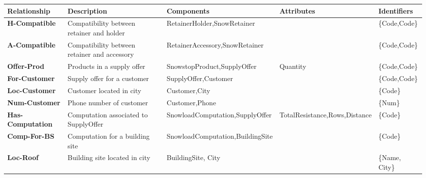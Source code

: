 \documentclass{article}[h]
\begin{document}
\begin{table}[H]
  \def\arraystretch{1.25}%
  \centering
  \begin{tabular}{ | m{3cm} | m{2.5cm}| m{3.5cm} | m{2.5cm} | m{2cm} |}  
    \hline
    {\textbf{\large Relationship}} & {\textbf{\large Description}} & {\textbf{\large Components}} & {\textbf{\large Attributes}} & {\textbf{\large Identifiers}} \\ 
    \hline
    \color[HTML]{3531FF} \textbf{H-Compatible} & Compatibility between retainer and holder & RetainerHolder,\newline SnowRetainer & & \{Code,Code\} \\ 
    \hline
    \color[HTML]{3531FF} \textbf{A-Compatible} & Compatibility between retainer and accessory & RetainerAccessory,\newline SnowRetainer & & \{Code,Code\} \\ 
    \hline
    \color[HTML]{3531FF} \textbf{Offer-Prod} & Products in a supply offer & SnowstopProduct,\newline SupplyOffer & Quantity  & \{Code,Code\} \\ 
    \hline
    \color[HTML]{3531FF} \textbf{For-Customer} & Supply offer for a customer & SupplyOffer,\newline Customer &  & \{Code,Code\} \\ 
    \hline
    \color[HTML]{3531FF} \textbf{Loc-Customer} & Customer located in city & Customer,\newline City &  & \{Code\} \\ 
    \hline
    \color[HTML]{3531FF} \textbf{Num-Customer} & Phone number of customer & Customer,\newline Phone &  & \{Num\} \\ 
    \hline
    \color[HTML]{3531FF} \textbf{Has-Computation} & Computation associated to SupplyOffer & SnowloadComputation,\newline SupplyOffer & TotalResistance,\newline Rows,\newline Distance & \{Code\} \\ 
    \hline
    \color[HTML]{3531FF} \textbf{Comp-For-BS} & Computation for a building site & SnowloadComputation,\newline BuildingSite & & \{Code\} \\ 
    \hline
    \color[HTML]{3531FF} \textbf{Loc-Roof} & Building site located in city & BuildingSite, City &  & \{Name, City\} \\ 

\end{tabular}
\end{table}
\end{document}
